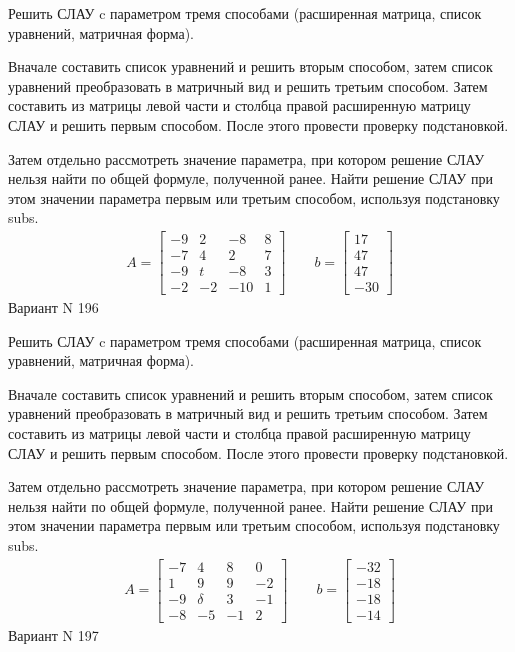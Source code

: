 \documentclass[11pt]{report}
\begin{document}
Решить СЛАУ c параметром тремя способами (расширенная матрица, список уравнений, матричная форма).

Вначале составить список уравнений и решить вторым способом,
затем список уравнений преобразовать в матричный вид и решить третьим способом.
Затем составить из матрицы левой части и столбца правой расширенную матрицу СЛАУ и решить первым способом.
После этого провести проверку подстановкой.

Затем отдельно рассмотреть значение параметра, при котором решение СЛАУ нельзя найти по общей формуле,
полученной ранее.
Найти решение СЛАУ при этом значении параметра первым или третьим способом, используя подстановку subs.
\begin{align*}
    A = \left[\begin{matrix}-9 & 2 & -8 & 8\\-7 & 4 & 2 & 7\\-9 & t & -8 & 3\\-2 & -2 & -10 & 1\end{matrix}\right]
\qquad b = \left[\begin{matrix}17\\47\\47\\-30\end{matrix}\right]
\end{align*}
\newpage
Вариант N 196


Решить СЛАУ c параметром тремя способами (расширенная матрица, список уравнений, матричная форма).

Вначале составить список уравнений и решить вторым способом,
затем список уравнений преобразовать в матричный вид и решить третьим способом.
Затем составить из матрицы левой части и столбца правой расширенную матрицу СЛАУ и решить первым способом.
После этого провести проверку подстановкой.

Затем отдельно рассмотреть значение параметра, при котором решение СЛАУ нельзя найти по общей формуле,
полученной ранее.
Найти решение СЛАУ при этом значении параметра первым или третьим способом, используя подстановку subs.
\begin{align*}
    A = \left[\begin{matrix}-7 & 4 & 8 & 0\\1 & 9 & 9 & -2\\-9 & \delta & 3 & -1\\-8 & -5 & -1 & 2\end{matrix}\right]
\qquad b = \left[\begin{matrix}-32\\-18\\-18\\-14\end{matrix}\right]
\end{align*}
\newpage
Вариант N 197
\end{document}
